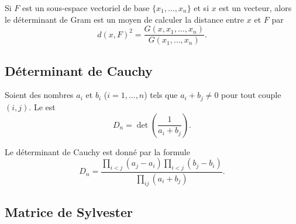 \begin{proposition}\label{PropMsZhIK}
    Si \( F\) est un sous-espace vectoriel de base \( \{ x_1,\ldots, x_n \}\) et si \( x\) est un vecteur, alors le déterminant de Gram est un moyen de calculer la distance entre \( x\) et \( F\) par
    \begin{equation}
        d(x,F)^2=\frac{ G(x,x_1,\ldots, x_n)}{ G(x_1,\ldots, x_n) }.
    \end{equation}
\end{proposition}

\subsection{Déterminant de Cauchy}

Soient des nombres \( a_i\) et \( b_i\) (\( i=1,\ldots, n\)) tels que \( a_i+b_j\neq 0\) pour tout couple \( (i,j)\). Le  est
\begin{equation}
    D_n=\det\left( \frac{1}{ a_i+b_j } \right).
\end{equation}

\begin{proposition} \label{ProptoDYKA}
    Le déterminant de Cauchy est donné par la formule
    \begin{equation}
        D_n=\frac{ \prod_{i<j}(a_j-a_i)\prod_{i<j}(b_j-b_i) }{ \prod_{ij}(a_i+b_j) }.
    \end{equation}
\end{proposition}

\subsection{Matrice de Sylvester}
\label{subsecSQBJfr}

